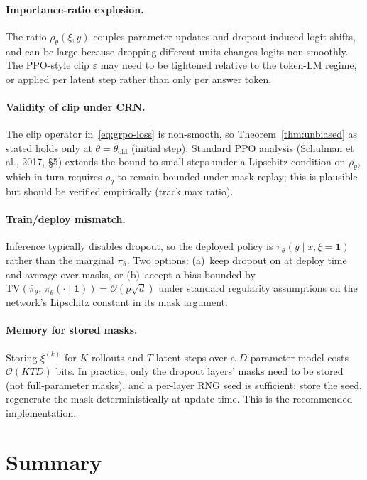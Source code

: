 \documentclass[11pt]{article}
\theoremstyle{definition}
\theoremstyle{remark}
\newcommand{\TV}{\mathrm{TV}}
\newcommand{\eps}{\varepsilon}
\newcommand{\old}{\mathrm{old}}
\begin{document}
\paragraph{Importance-ratio explosion.}
The ratio $\rho_\theta(\xi,y)$ couples parameter updates and dropout-induced
logit shifts, and can be large because dropping different units changes logits
non-smoothly.  The PPO-style clip $\eps$ may need to be tightened relative to
the token-LM regime, or applied per latent step rather than only per answer
token.

\paragraph{Validity of clip under CRN.}
The clip operator in~\eqref{eq:grpo-loss} is non-smooth, so
Theorem~\ref{thm:unbiased} as stated holds only at $\theta = \theta_\old$
(initial step).  Standard PPO analysis (Schulman et al., 2017, \S 5) extends
the bound to small steps under a Lipschitz condition on $\rho_\theta$, which
in turn requires $\rho_\theta$ to remain bounded under mask replay; this is
plausible but should be verified empirically (track max ratio).

\paragraph{Train/deploy mismatch.}
Inference typically disables dropout, so the deployed policy is
$\pi_\theta(y\mid x, \xi=\mathbf 1)$ rather than the marginal
$\bar\pi_\theta$.  Two options: (a)~keep dropout on at deploy time and average
over masks, or (b)~accept a bias bounded by
$\TV(\bar\pi_\theta,\,\pi_\theta(\cdot\mid \mathbf 1)) = \mathcal{O}(p\sqrt d)$
under standard regularity assumptions on the network's Lipschitz constant in
its mask argument.

\paragraph{Memory for stored masks.}
Storing $\xi^{(k)}$ for $K$ rollouts and $T$ latent steps over a $D$-parameter
model costs $\mathcal{O}(KTD)$ bits.  In practice, only the dropout layers'
masks need to be stored (not full-parameter masks), and a per-layer RNG seed
is sufficient: store the seed, regenerate the mask deterministically at
update time.  This is the recommended implementation.

\section{Summary}
\end{document}
